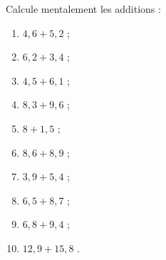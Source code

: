 \begin{exercice}
Calcule mentalement les additions :
\begin{enumerate} 
 \item $4,6 + 5,2$ \dotfill ; \hspace*{12em}
 
 \item $6,2 + 3,4$ \dotfill ; \hspace*{12em}
 
 \item $4,5 + 6,1$ \dotfill ; \hspace*{12em}
 
 \item $8,3 + 9,6$ \dotfill ; \hspace*{12em}
 
 \item $8 + 1,5$ \dotfill ; \hspace*{12em}
 
 \item $8,6 + 8,9$ \dotfill ; \hspace*{12em}
 
 \item $3,9 + 5,4$ \dotfill ; \hspace*{12em}
 
 \item $6,5 + 8,7$ \dotfill ; \hspace*{12em}
 
 \item $6,8 + 9,4$ \dotfill ; \hspace*{12em}
 
 \item \hspace{0.1em} $12,9 + 15,8$ \dotfill. \hspace*{12em}

 \end{enumerate}
\end{exercice}



